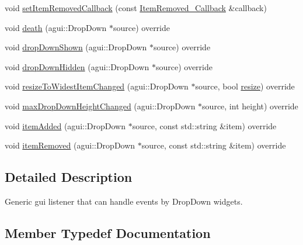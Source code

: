 \begin{DoxyCompactItemize}
void \mbox{\hyperlink{classec_1_1_generic_drop_down_listener_ad326f7205b7fc547b17f777500025b8e}{set\+Item\+Removed\+Callback}} (const \mbox{\hyperlink{classec_1_1_generic_drop_down_listener_ad1513561f8a3a3614e207797df83e730}{Item\+Removed\+\_\+\+Callback}} \&callback)
\item 
void \mbox{\hyperlink{classec_1_1_generic_drop_down_listener_a3d36f29d51150dac52d796af2da6b6e9}{death}} (agui\+::\+Drop\+Down $\ast$source) override
\item 
void \mbox{\hyperlink{classec_1_1_generic_drop_down_listener_a23e0a88ebbf1a012d9e2c7619785cde8}{drop\+Down\+Shown}} (agui\+::\+Drop\+Down $\ast$source) override
\item 
void \mbox{\hyperlink{classec_1_1_generic_drop_down_listener_ab482ffbd92369ad620fa570ac8bd69a3}{drop\+Down\+Hidden}} (agui\+::\+Drop\+Down $\ast$source) override
\item 
void \mbox{\hyperlink{classec_1_1_generic_drop_down_listener_aad542fa958815248290047ca0b8eff08}{resize\+To\+Widest\+Item\+Changed}} (agui\+::\+Drop\+Down $\ast$source, bool \mbox{\hyperlink{namespaceec_a84e452d7f020435b50e2c18e7cdca968}{resize}}) override
\item 
void \mbox{\hyperlink{classec_1_1_generic_drop_down_listener_abed6078e4b6c0412d790bb4c782e99f7}{max\+Drop\+Down\+Height\+Changed}} (agui\+::\+Drop\+Down $\ast$source, int height) override
\item 
void \mbox{\hyperlink{classec_1_1_generic_drop_down_listener_a33748da34ef4c229a31cafc4c3cb8c79}{item\+Added}} (agui\+::\+Drop\+Down $\ast$source, const std\+::string \&item) override
\item 
void \mbox{\hyperlink{classec_1_1_generic_drop_down_listener_a492a498a0c2624b2f96beb01ce18e837}{item\+Removed}} (agui\+::\+Drop\+Down $\ast$source, const std\+::string \&item) override
\end{DoxyCompactItemize}


\subsection{Detailed Description}
Generic gui listener that can handle events by Drop\+Down widgets. 

\subsection{Member Typedef Documentation}
\mbox{\label{classec_1_1_generic_drop_down_listener_a72a84eeb2fdcc0eae78b78c53a59db3b}} 
